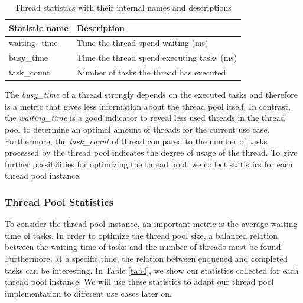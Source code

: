 \documentclass[conference]{IEEEtran}
\begin{document}
\begin{table}[htbp]
	\caption{Thread statistics with their internal names and descriptions}
	\begin{center}
		\begin{tabular}{ l l }
			\hline
			\textbf{Statistic name}&\textbf{Description}\\
			\hline
			waiting\_time & Time the thread spend waiting (ms) \\
			busy\_time & Time the thread spend executing tasks (ms)\\
			task\_count & Number of tasks the thread has executed \\
			\hline
		\end{tabular}
		\label{tab3}
	\end{center}
\end{table}

The \emph{busy\_time} of a thread strongly depends on the executed tasks and therefore is a metric that gives less information about the thread pool itself. In contrast, the \emph{waiting\_time} is a good indicator to reveal less used threads in the thread pool to determine an optimal amount of threads for the current use case. Furthermore, the \emph{task\_count} of thread compared to the number of tasks processed by the thread pool indicates the degree of usage of the thread. To give further possibilities for optimizing the thread pool, we collect statistics for each thread pool instance.

\subsubsection{Thread Pool Statistics}
To consider the thread pool instance, an important metric is the average waiting time of tasks. In order to optimize the thread pool size, a balanced relation between the waiting time of tasks and the number of threads must be found. Furthermore, at a specific time, the relation between enqueued and completed tasks can be interesting. In Table \ref{tab4}, we show our statistics collected for each thread pool instance. We will use these statistics to adapt our thread pool implementation to different use cases later on.
\end{document}
